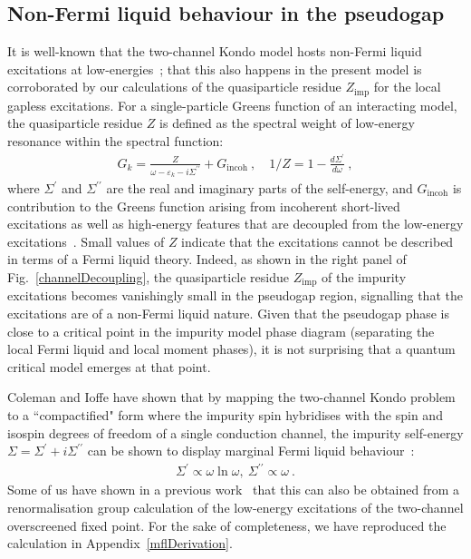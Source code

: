 \documentclass[reprint,hidelinks,onecolumn]{revtex4-2}
\begin{document}
\subsection{Non-Fermi liquid behaviour in the pseudogap}\label{marginalFL}
It is well-known that the two-channel Kondo model hosts non-Fermi liquid excitations at low-energies~\cite{Tsvelick_weigmann_mchannel_1985,emery_kivelson}; that this also happens in the present model is corroborated by our calculations of the quasiparticle residue \(Z_\text{imp}\) for the local gapless excitations. For a single-particle Greens function of an interacting model, the quasiparticle residue \(Z\) is defined as the spectral weight of low-energy resonance within the spectral function:
\begin{equation}\begin{aligned}
	G_k = \frac{Z}{\omega - \varepsilon_k - i \Sigma^{\prime\prime}} + G_\text{incoh}~,\quad 1/Z = 1- \frac{d \Sigma^{\prime}}{d\omega}~,
\end{aligned}\end{equation}
where \(\Sigma^\prime\) and \(\Sigma^{\prime\prime}\) are the real and imaginary parts of the self-energy, and \(G_\text{incoh}\) is contribution to the Greens function arising from incoherent short-lived excitations as well as high-energy features that are decoupled from the low-energy excitations~\cite{varma-physrevlett.63.1996}. Small values of \(Z\) indicate that the excitations cannot be described in terms of a Fermi liquid theory. Indeed, as shown in the right panel of Fig.~\ref{channelDecoupling}, the quasiparticle residue \(Z_\text{imp}\) of the impurity excitations becomes vanishingly small in the pseudogap region, signalling that the excitations are of a non-Fermi liquid nature. Given that the pseudogap phase is close to a critical point in the impurity model phase diagram (separating the local Fermi liquid and local moment phases), it is not surprising that a quantum critical model emerges at that point.

Coleman and Ioffe have shown that by mapping the two-channel Kondo problem to a ``compactified" form where the impurity spin hybridises with the spin and isospin degrees of freedom of a single conduction channel, the impurity self-energy \(\Sigma = \Sigma^\prime + i\Sigma^{\prime\prime}\) can be shown to display marginal Fermi liquid behaviour~\cite{Coleman_tsvelik,Schofield1997}:
\begin{equation}\begin{aligned}
	\Sigma^\prime \propto \omega \ln \omega, ~\Sigma^{\prime\prime} \propto \omega~.
\end{aligned}\end{equation}
Some of us have shown in a previous work~\cite{Patra2023MCK} that this can also be obtained from a renormalisation group calculation of the low-energy excitations of the two-channel overscreened fixed point. For the sake of completeness, we have reproduced the calculation in Appendix~\ref{mflDerivation}.
\end{document}
